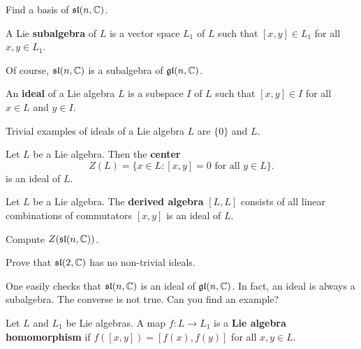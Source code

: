 \begin{exercise}
    Find a basis of $\mathfrak{sl}(n,\mathbb{C})$. 
\end{exercise}


\begin{definition}
    A Lie \textbf{subalgebra} of $L$ is a vector space $L_1$ of $L$ 
    such that $[x,y]\in L_1$ for all $x,y\in L_1$. 
\end{definition}

Of course, $\mathfrak{sl}(n,\mathbb{C})$ is a subalgebra of $\mathfrak{gl}(n,\mathbb{C})$. 

\begin{definition}
    An \textbf{ideal} of a Lie algebra $L$ is a subspace $I$ of $L$ 
    such that $[x,y]\in I$ for all $x\in L$ and $y\in I$. 
\end{definition}

Trivial examples of ideals of a Lie algebra $L$ are
$\{0\}$ and $L$.

\begin{example}
    Let $L$ be a Lie algebra. Then 
    the \textbf{center} 
    \[
    Z(L)=\{x\in L:[x,y]=0\text{ for all $y\in L$}\}.
    \]
    is an ideal of $L$. 
\end{example}

\begin{example}
    Let $L$ be a Lie algebra. 
    The \textbf{derived algebra} $[L,L]$
    consists of all linear combinations of commutators $[x,y]$ 
    is an ideal of $L$. 
\end{example}

\begin{exercise}
    Compute $Z(\mathfrak{sl}(n,\mathbb{C}))$. 
\end{exercise}

\begin{exercise}
    Prove that $\mathfrak{sl}(2,\mathbb{C})$ has no non-trivial ideals. 
\end{exercise}

One easily checks that $\mathfrak{sl}(n,\mathbb{C})$ is an ideal of $\mathfrak{gl}(n,\mathbb{C})$. In fact, 
an ideal is always a subalgebra. The converse is not true. 
Can you find an example?

\begin{definition}
    Let $L$ and $L_1$ be Lie algebras. A map $f\colon L\to L_1$ is a 
    \textbf{Lie algebra homomorphism} if $f([x,y])=[f(x),f(y)]$ for all
    $x,y\in L$. 
\end{definition}

